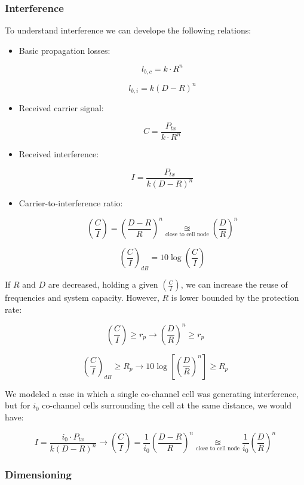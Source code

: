 \documentclass[../main.tex]{subfiles}
\begin{document}
\subsubsection{Interference}

To understand interference we can develope the following relations:

\begin{itemize}
	\item {
		Basic propagation losses:

		$$l_{b, c} = k \cdot R^n$$

		$$l_{b, i} = k (D - R)^n$$
	}
	\item {
		Received carrier signal:

		$$C = \frac {P_{tx}} {k \cdot R^n}$$
	}
	\item {
		Received interference:

		$$I = \frac {P_{tx}} {k (D - R)^n}$$
	}
	\item {
		Carrier-to-interference ratio:

		$$
			\left( \frac{C}{I} \right) = \left( \frac {D - R} {R} \right)^n \underset{\text{close to cell node}}{\approxeq} \left( \frac {D} {R} \right)^n
		$$

		$$
			\left( \frac{C}{I} \right)_{dB} = 10 \log \left( \frac{C}{I} \right)
		$$
	}
\end{itemize}

If $R$ and $D$ are decreased, holding a given $\left( \frac{C}{I} \right)$, we can increase the reuse of frequencies and system capacity. However, $R$ is lower bounded by the protection rate:

$$
	\left( \frac{C}{I} \right) \ge r_p \rightarrow \left( \frac {D} {R} \right)^n \ge r_p
$$

$$
	\left( \frac{C}{I} \right)_{dB} \ge R_p \rightarrow 10 \log \left[ \left( \frac {D} {R} \right)^n \right] \ge R_p
$$

We modeled a case in which a single co-channel cell was generating interference, but for $i_0$ co-channel cells surrounding the cell at the same distance, we would have:

$$
	I = \frac {i_0 \cdot P_{tx}} {k (D - R)^n} \rightarrow \left( \frac{C}{I} \right) = \frac{1}{i_0} \left( \frac {D - R} {R} \right)^n \underset{\text{close to cell node}}{\approxeq} \frac{1}{i_0} \left( \frac {D} {R} \right)^n
$$

\subsubsection{Dimensioning}
\end{document}
